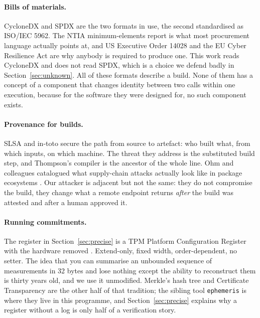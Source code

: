 \documentclass[11pt]{article}
\newcommand{\ephemeris}{\texttt{ephemeris}}
\begin{document}
\paragraph{Bills of materials.} CycloneDX \cite{cyclonedx} and SPDX
\cite{spdx} are the two formats in use, the second standardised as ISO/IEC
5962. The NTIA minimum-elements report \cite{ntiasbom} is what most
procurement language actually points at, and US Executive Order 14028
\cite{eo14028} and the EU Cyber Resilience Act \cite{eucra} are why anybody is
required to produce one. This work reads CycloneDX and does not read SPDX,
which is a choice we defend badly in Section~\ref{sec:unknown}. All of these
formats describe a build. None of them has a concept of a component that
changes identity between two calls within one execution, because for the
software they were designed for, no such component exists.

\paragraph{Provenance for builds.} SLSA \cite{slsa} and in-toto
\cite{intoto} secure the path from source to artefact: who built what, from
which inputs, on which machine. The threat they address is the substituted
build step, and Thompson's compiler \cite{thompson1984} is the ancestor of
the whole line. Ohm and colleagues catalogued what supply-chain attacks
actually look like in package ecosystems \cite{ohm2020}. Our attacker is
adjacent but not the same: they do not compromise the build, they change what
a remote endpoint returns \emph{after} the build was attested and after a
human approved it.

\paragraph{Running commitments.} The register in Section~\ref{sec:precise} is
a TPM Platform Configuration Register with the hardware removed
\cite{tpm2}. Extend-only, fixed width, order-dependent, no setter. The idea
that you can summarise an unbounded sequence of measurements in 32 bytes and
lose nothing except the ability to reconstruct them is thirty years old, and
we use it unmodified. Merkle's hash tree \cite{merkle1980} and Certificate
Transparency \cite{rfc6962} are the other half of that tradition; the
sibling tool \ephemeris{} \cite{ephemeristool} is where they live in this
programme, and Section~\ref{sec:precise} explains why a register without a log
is only half of a verification story.
\end{document}
